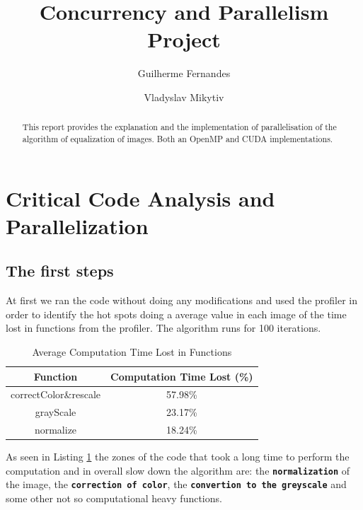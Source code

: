 \documentclass[sigconf]{acmart}
\begin{document}
\title{Concurrency and Parallelism Project}


\author{Guilherme Fernandes}

\author{Vladyslav Mikytiv}


\begin{abstract}
This report provides the explanation and the implementation of parallelisation of the algorithm of equalization of images. Both an OpenMP and CUDA implementations.

\end{abstract}




\maketitle

\section{Critical Code Analysis and Parallelization}
\subsection{The first steps}

At first we ran the code without doing any modifications and used the profiler in order to identify the hot spots doing a average value in each image of the time lost in functions from the profiler. The algorithm runs for 100 iterations.

\begin{table}[h!]
\centering
\begin{tabular}{|c|c|}
\hline
\textbf{Function} & \textbf{Computation Time Lost (\%)} \\
\hline
correctColor\&rescale & 57.98\% \\
\hline
grayScale & 23.17\% \\
\hline
normalize & 18.24\% \\
\hline
\end{tabular}
\vspace{0.2cm} %
\caption{Average Computation Time Lost in Functions}
\label{table:computation_time_lost}
\end{table}
As seen in Listing \ref{table:computation_time_lost} the zones of the code that took a long time to perform the computation and in overall slow down the algorithm are:
the \textbf{\texttt{normalization}} of the image, the \textbf{\texttt{correction of color}}, the \textbf{\texttt{convertion to the greyscale}} and some other
not so computational heavy functions.
\end{document}
